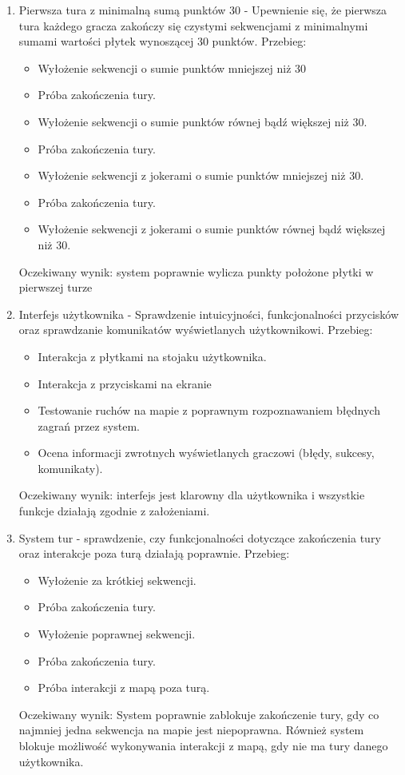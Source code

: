 \documentclass[a4paper,twoside,12pt]{book}
\begin{document}
\begin{enumerate}
\begin{itemize}
			\end{itemize}
			Oczekiwany wynik: system poprawnie wykrywa jokery jako uniwersalne płytki.
		\item Pierwsza tura z minimalną sumą punktów 30 - Upewnienie się, że pierwsza tura każdego gracza zakończy się czystymi sekwencjami z minimalnymi sumami wartości płytek wynoszącej 30 punktów. Przebieg:
			\begin{itemize}
				\item Wyłożenie sekwencji o sumie punktów mniejszej niż 30
				\item Próba zakończenia tury.
				\item Wyłożenie sekwencji o sumie punktów równej bądź większej niż 30.
				\item Próba zakończenia tury.
				\item Wyłożenie sekwencji z jokerami o sumie punktów mniejszej niż 30.
				\item Próba zakończenia tury.
				\item Wyłożenie sekwencji z jokerami o sumie punktów równej bądź większej niż 30.
			
			\end{itemize}	 
			Oczekiwany wynik: system poprawnie wylicza punkty położone płytki w pierwszej turze
		\item Interfejs użytkownika - Sprawdzenie intuicyjności, funkcjonalności przycisków oraz sprawdzanie komunikatów wyświetlanych użytkownikowi. Przebieg:
			\begin{itemize}
				\item Interakcja z płytkami na stojaku użytkownika.
				\item Interakcja z przyciskami na ekranie
				\item Testowanie ruchów na mapie z poprawnym rozpoznawaniem błędnych zagrań przez system.
				\item Ocena informacji zwrotnych wyświetlanych graczowi (błędy, sukcesy, komunikaty).
				
			\end{itemize}
		Oczekiwany wynik: interfejs jest klarowny dla użytkownika i wszystkie funkcje działają zgodnie z założeniami.
		\item System tur - sprawdzenie, czy funkcjonalności dotyczące zakończenia tury oraz interakcje poza turą działają poprawnie. Przebieg:
			\begin{itemize}
				\item Wyłożenie za krótkiej sekwencji.
				\item Próba zakończenia tury.
				\item Wyłożenie poprawnej sekwencji.
				\item Próba zakończenia tury.
				\item Próba interakcji z mapą poza turą.
			\end{itemize}
			Oczekiwany wynik: System poprawnie zablokuje zakończenie tury, gdy co najmniej jedna sekwencja na mapie jest niepoprawna. Również system blokuje możliwość wykonywania interakcji z mapą, gdy nie ma tury danego użytkownika.
	\end{enumerate}
\end{document}
